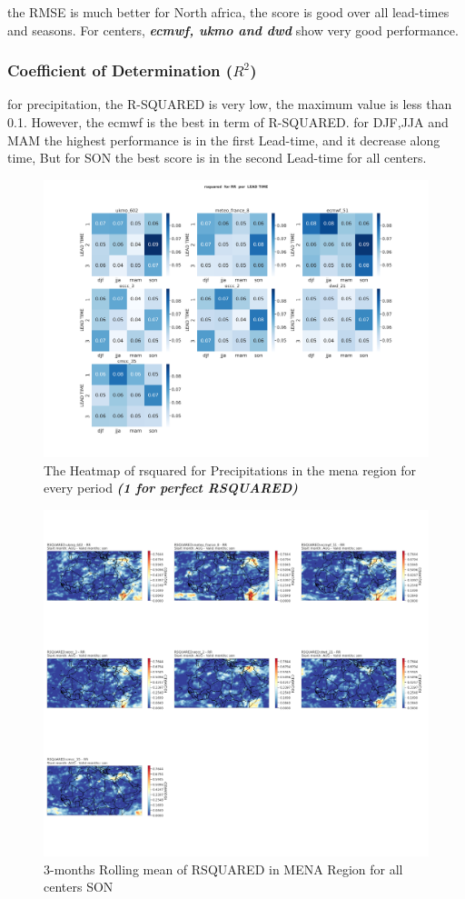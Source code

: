 the RMSE is much better for North africa, the score is good over all lead-times and seasons. For centers, \textbf{\textit{ecmwf, ukmo and dwd}} show very good performance.


\subsubsection{Coefficient of Determination (\( R^2 \))}
for precipitation, the R-SQUARED is very low, the maximum value is less than 0.1. However, the ecmwf is the best in term of R-SQUARED. for DJF,JJA and MAM the highest performance is in the first Lead-time, and it decrease along time, But for SON the best score is in the second Lead-time for all centers.
\begin{figure}[H]
	\centering
	\includegraphics[scale=0.25]{plots/det/rsquared/rsquared_RR.png}
	\caption{The Heatmap of rsquared for Precipitations in the mena region for every period \textbf{\textit{(1 for perfect RSQUARED)} }}
\end{figure}


\begin{figure}[H]
\includegraphics[scale=0.3]{plots/det/rsquared/rsquared_son_RR.png}
\caption{3-months Rolling mean of RSQUARED in MENA Region for all centers SON}
\end{figure}

